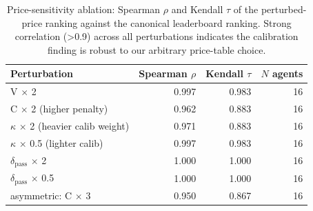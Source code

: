 \begin{table}[t]\centering\small
\caption{Price-sensitivity ablation: Spearman $\rho$ and Kendall $\tau$ of the perturbed-price ranking against the canonical leaderboard ranking. Strong correlation (>0.9) across all perturbations indicates the calibration finding is robust to our arbitrary price-table choice.}\label{tab:price-sensitivity}
\begin{tabular}{lrrr}
\toprule
Perturbation & Spearman $\rho$ & Kendall $\tau$ & $N$ agents \\
\midrule
V $\times$ 2 & 0.997 & 0.983 & 16 \\
C $\times$ 2 (higher penalty) & 0.962 & 0.883 & 16 \\
$\kappa$ $\times$ 2 (heavier calib weight) & 0.971 & 0.883 & 16 \\
$\kappa$ $\times$ 0.5 (lighter calib) & 0.997 & 0.983 & 16 \\
$\delta_{\text{pass}}$ $\times$ 2 & 1.000 & 1.000 & 16 \\
$\delta_{\text{pass}}$ $\times$ 0.5 & 1.000 & 1.000 & 16 \\
asymmetric: C $\times$ 3 & 0.950 & 0.867 & 16 \\
\bottomrule
\end{tabular}
\end{table}